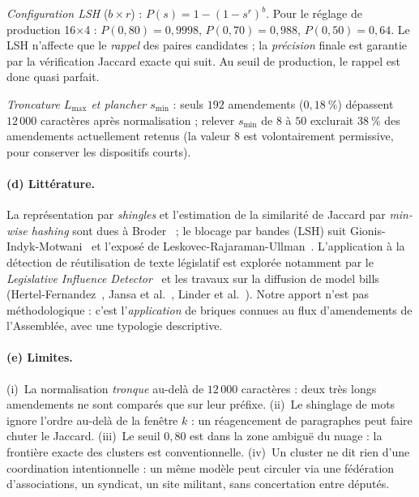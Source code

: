 \documentclass[11pt,a4paper]{article}
\begin{document}
\emph{Configuration LSH} ($b\times r$) : $P(s)=1-(1-s^r)^b$. Pour le réglage de
production 16$\times$4 : $P(0{,}80)=0{,}9998$, $P(0{,}70)=0{,}988$, $P(0{,}50)=0{,}64$.
Le LSH n'affecte que le \emph{rappel} des paires candidates ; la \emph{précision}
finale est garantie par la vérification Jaccard exacte qui suit. Au seuil de
production, le rappel est donc quasi parfait.

\emph{Troncature $L_{\max}$ et plancher $s_{\min}$} : seuls $192$ amendements
($0{,}18~\%$) dépassent $12\,000$ caractères après normalisation ; relever
$s_{\min}$ de $8$ à $50$ exclurait $38~\%$ des amendements actuellement retenus
(la valeur $8$ est volontairement permissive, pour conserver les dispositifs
courts).

\paragraph{(d) Littérature.} La représentation par \emph{shingles} et l'estimation
de la similarité de Jaccard par \emph{min-wise hashing} sont dues à
Broder~\cite{broder1997,broder2000} ; le blocage par bandes (LSH) suit
Gionis-Indyk-Motwani~\cite{gionis1999} et l'exposé de
Leskovec-Rajaraman-Ullman~\cite{lru2014}. L'application à la détection de
réutilisation de texte législatif est explorée notamment par le \emph{Legislative
Influence Detector}~\cite{burgess2016} et les travaux sur la diffusion de \og{}model
bills\fg{} (Hertel-Fernandez~\cite{hf2014}, Jansa et al.~\cite{jansa2019},
Linder et al.~\cite{linder2020}). Notre apport n'est pas méthodologique : c'est
l'\emph{application} de briques connues au flux d'amendements de l'Assemblée, avec
une typologie descriptive.

\paragraph{(e) Limites.} (i)~La normalisation \emph{tronque} au-delà de $12\,000$
caractères : deux très longs amendements ne sont comparés que sur leur préfixe.
(ii)~Le shinglage de mots ignore l'ordre au-delà de la fenêtre $k$ : un
réagencement de paragraphes peut faire chuter le Jaccard. (iii)~Le seuil $0{,}80$
est dans la zone ambiguë du nuage : la frontière exacte des clusters est
conventionnelle. (iv)~Un \og{}cluster\fg{} ne dit rien d'une coordination
intentionnelle : un même modèle peut circuler via une fédération d'associations,
un syndicat, un site militant, sans concertation entre députés.

\end{document}

